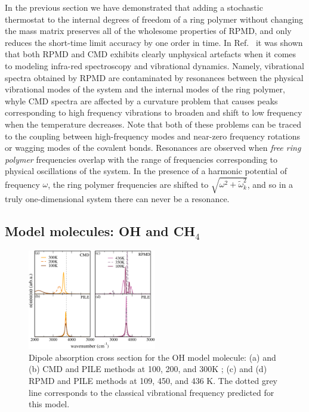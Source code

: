 \documentclass[aps,prb,superscriptaddress,amsmath,amssymb,showpacs,twocolumn]{revtex4}
\begin{document}
In the previous section we have demonstrated that adding a stochastic thermostat to the internal degrees of freedom
of a ring polymer without changing the mass matrix preserves all of the wholesome properties of RPMD, and only reduces
the short-time limit accuracy by one order in time. In Ref.~\cite{witt+09jcp} it was shown that both RPMD and CMD 
exhibits clearly unphysical artefacts when it comes to modeling infra-red spectroscopy and vibrational dynamics. 
Namely, vibrational spectra obtained by RPMD are contaminated by resonances between the physical vibrational modes
of the system and the internal modes of the ring polymer, whyle CMD spectra are affected by a curvature problem that
causes peaks corresponding to high frequency vibrations to broaden and shift to low frequency when the temperature
decreases. 
Note that both of these problems can be traced to the coupling between high-frequency modes and 
near-zero frequency rotations or wagging modes of the covalent bonds. Resonances are observed when \emph{free ring polymer}
frequencies overlap with the range of frequencies corresponding to physical oscillations of the system. 
In the presence of a harmonic potential of frequency $\omega$, the ring polymer frequencies are shifted to
$\sqrt{\omega^2 + \tilde{\omega}^2_k}$, and so in a truly one-dimensional system there can never be a resonance. 


\subsection{Model molecules: OH and CH$_4$}

\begin{figure}[htbp]
\centering
\includegraphics[width=0.5\textwidth]{figures/comparison_oh_factors.pdf}
\caption{Dipole absorption cross section for the OH model molecule: (a) and (b) CMD and PILE methods at 100, 200, and 300K ; (c)  and (d) RPMD and PILE methods at 109, 450, and 436 K. The dotted grey line corresponds to the classical vibrational frequency predicted for this model.}
\label{fig:oh-rpmd-cmd-pile}
\end{figure}
\end{document}
